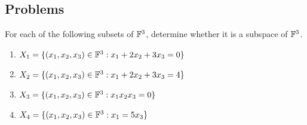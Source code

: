 \subsection{Problems}

\begin{exercise}
For each of the following subsets of $\mathbb{F}^3$, determine whether it is a subspace of $\mathbb{F}^3$.
\begin{enumerate}
\item[(a)] $X_1=\{(x_1, x_2, x_3) \in \mathbb{F}^3 : x_1 + 2x_2 + 3x_3 = 0\}$
\item[(b)] $X_2=\{(x_1, x_2, x_3) \in \mathbb{F}^3 : x_1 + 2x_2 + 3x_3 = 4\}$
\item[(c)] $X_3=\{(x_1, x_2, x_3) \in \mathbb{F}^3 : x_1x_2x_3 = 0\}$
\item[(d)] $X_4=\{(x_1, x_2, x_3) \in \mathbb{F}^3 : x_1 = 5x_3\}$
\end{enumerate}
\end{exercise}

